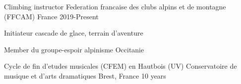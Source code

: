 

\begin{cventries}

  \cventry
    {Climbing instructor} %
    {Federation francaise des clubs alpins et de montagne (FFCAM)} %
    {France} %
    {2019-Present} %
    {
      \begin{cvitems} %
        \item {Initiateur cascade de glace, terrain d'aventure}
        \item {Member du groupe-espoir alpinisme Occitanie}
      \end{cvitems}
    }

  \cventry
  {Cycle de fin d'etudes musicales (CFEM) en Hautbois (UV)} %
    {Conservatoire de musique et d'arts dramatiques} %
    {Brest, France} %
    {10 years} %
    { }
\end{cventries}
